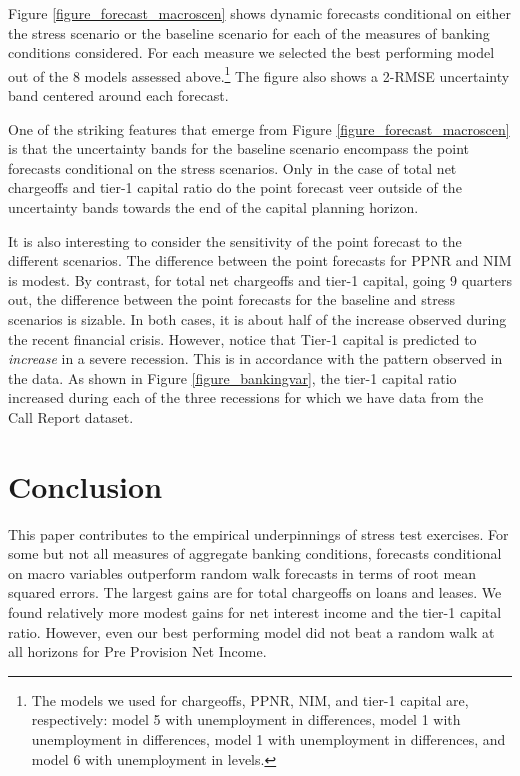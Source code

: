 \documentclass[12pt]{article}
\begin{document}
Figure \ref{figure_forecast_macroscen} shows dynamic forecasts
conditional on either the stress scenario or the baseline scenario
for each of the measures of banking conditions considered. For
each measure we selected the best performing model out of the 8
models assessed above.\footnote{The models we used for chargeoffs,
PPNR, NIM, and tier-1 capital are, respectively: model 5 with
unemployment in differences, model 1 with unemployment in
differences, model 1 with unemployment in differences, and model 6
with unemployment in levels.} The figure also shows a 2-RMSE
uncertainty band centered around each forecast.

One of the striking features that emerge from Figure
\ref{figure_forecast_macroscen} is that the uncertainty bands for
the baseline scenario encompass the point forecasts conditional on
the stress scenarios. Only in the case of total net chargeoffs and
tier-1 capital ratio do the point forecast veer outside of the
uncertainty bands towards the end of the capital planning horizon.

It is also interesting to consider the sensitivity of the point
forecast to the different scenarios. The difference between the
point forecasts for PPNR and NIM is modest. By contrast, for total
net chargeoffs and tier-1 capital, going 9 quarters out, the
difference between the point forecasts for the baseline and stress
scenarios is sizable. In both cases, it is about half of the
increase observed during the recent financial crisis. However,
notice that Tier-1 capital is predicted to \emph{increase} in a
severe recession. This is in accordance with the pattern observed
in the data. As shown in Figure \ref{figure_bankingvar}, the
tier-1 capital ratio increased during each of the three recessions
for which we have data from the Call Report dataset.

\section{Conclusion} \label{section_conclusion}

This paper contributes to the empirical underpinnings of stress
test exercises. For some but not all measures of aggregate banking
conditions, forecasts conditional on macro variables outperform
random walk forecasts in terms of root mean squared errors. The
largest gains are for total chargeoffs on loans and leases.  We
found relatively more modest gains for net interest income and the
tier-1 capital ratio. However, even our best performing model did
not beat a random walk at all horizons for Pre Provision Net
Income.
\end{document}
